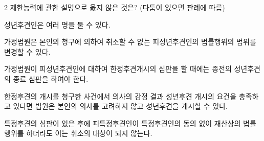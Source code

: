 \begin{question}{2}
제한능력에 관한 설명으로 옳지 않은 것은? (다툼이 있으면 판례에 따름)
\begin{choices}
  \item 성년후견인은 여러 명을 둘 수 있다.
  \item 가정법원은 본인의 청구에 의하여 취소할 수 없는 피성년후견인의 법률행위의 범위를 변경할 수 있다.
  \item 가정법원이 피성년후견인에 대하여 한정후견개시의 심판을 할 때에는 종전의 성년후견의 종료 심판을 하여야 한다.
  \item 한정후견의 개시를 청구한 사건에서 의사의 감정 결과 성년후견 개시의 요건을 충족하고 있다면 법원은 본인의 의사를 고려하지 않고 성년후견을 개시할 수 있다.
  \item 특정후견의 심판이 있은 후에 피특정후견인이 특정후견인의 동의 없이 재산상의 법률행위를 하더라도 이는 취소의 대상이 되지 않는다.
\end{choices}
\end{question}
